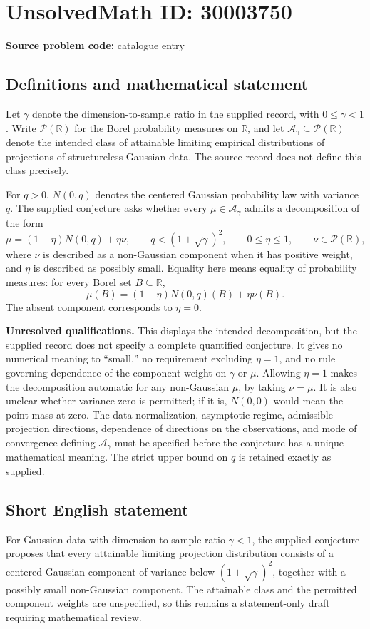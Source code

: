 \documentclass[11pt]{article}
\newcommand{\R}{\mathbb{R}}
\begin{document}
\section*{UnsolvedMath ID: 30003750}
\textbf{Source problem code:} catalogue entry
\subsection{Definitions and mathematical statement}
Let \(\gamma\) denote the dimension-to-sample ratio in the supplied record, with \(0\leq\gamma<1\). Write \(\mathcal P(\R)\) for the Borel probability measures on \(\R\), and let \(\mathcal A_\gamma\subseteq\mathcal P(\R)\) denote the intended class of attainable limiting empirical distributions of projections of structureless Gaussian data. The source record does not define this class precisely.

For \(q>0\), \(N(0,q)\) denotes the centered Gaussian probability law with variance \(q\). The supplied conjecture asks whether every \(\mu\in\mathcal A_\gamma\) admits a decomposition of the form
\[
\mu=(1-\eta)N(0,q)+\eta\nu,
\qquad q<(1+\sqrt\gamma)^2,
\qquad 0\leq\eta\leq1,
\qquad \nu\in\mathcal P(\R),
\]
where \(\nu\) is described as a non-Gaussian component when it has positive weight, and \(\eta\) is described as possibly small. Equality here means equality of probability measures: for every Borel set \(B\subseteq\R\),
\[
\mu(B)=(1-\eta)N(0,q)(B)+\eta\nu(B).
\]
The absent component corresponds to \(\eta=0\).

\textbf{Unresolved qualifications.} This displays the intended decomposition, but the supplied record does not specify a complete quantified conjecture. It gives no numerical meaning to ``small,'' no requirement excluding \(\eta=1\), and no rule governing dependence of the component weight on \(\gamma\) or \(\mu\). Allowing \(\eta=1\) makes the decomposition automatic for any non-Gaussian \(\mu\), by taking \(\nu=\mu\). It is also unclear whether variance zero is permitted; if it is, \(N(0,0)\) would mean the point mass at zero. The data normalization, asymptotic regime, admissible projection directions, dependence of directions on the observations, and mode of convergence defining \(\mathcal A_\gamma\) must be specified before the conjecture has a unique mathematical meaning. The strict upper bound on \(q\) is retained exactly as supplied.
\subsection{Short English statement}
For Gaussian data with dimension-to-sample ratio \(\gamma<1\), the supplied conjecture proposes that every attainable limiting projection distribution consists of a centered Gaussian component of variance below \((1+\sqrt\gamma)^2\), together with a possibly small non-Gaussian component. The attainable class and the permitted component weights are unspecified, so this remains a statement-only draft requiring mathematical review.
\end{document}
